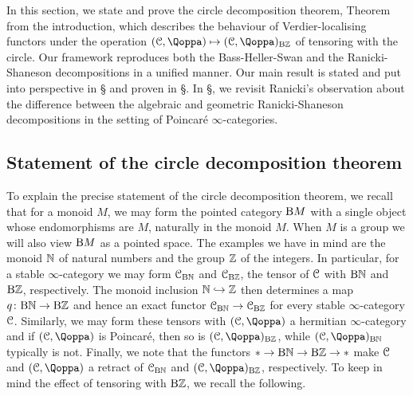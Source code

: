 In this section, we state and prove the circle decomposition theorem, Theorem~ from the introduction, which describes the behaviour of Verdier-localising functors under the operation $(\C,\QF) \mapsto (\C,\QF)_{\B\ZZ}$ of tensoring with the circle. Our framework reproduces both the Bass-Heller-Swan and the Ranicki-Shaneson decompositions in a unified manner. 
Our main result is stated and put into perspective in \S{} and proven in \S{}. In \S{}, we revisit Ranicki's observation about the difference between the algebraic and geometric Ranicki-Shaneson decompositions in the setting of Poincaré $\infty$-categories.



\subsection{Statement of the circle decomposition theorem}
\label{subsection:shaneson}%


 


To explain the precise statement of the circle decomposition theorem, we recall that for a monoid $M$, we may form the pointed category $\mathrm{B} M$ with a single object whose endomorphisms are $M$, naturally in the monoid $M$. When $M$ is a group we will also view $\mathrm{B} M$ as a pointed space. The examples we have in mind are the monoid $\mathbb{N}$ of natural numbers and the group $\mathbb{Z}$ of the integers.
In particular, 
for a stable $\infty$-category we may form $\mathcal C_{\mathrm{B}\mathbb{N}}$ and $\mathcal C_{\mathrm{B}\mathbb{Z}}$, the tensor of $\mathcal C$ with $\mathrm{B}\mathbb{N}$ and $\mathrm{B}\mathbb{Z}$, respectively. The monoid inclusion $\mathbb{N} \hookrightarrow \mathbb{Z}$ then determines a map $q\colon\mathrm{B}\mathbb{N} \to \mathrm{B}\mathbb{Z}$ and hence an exact functor $\mathcal C_{\mathrm{B}\mathbb{N}} \to \mathcal C_{\mathrm{B}\mathbb{Z}}$ for every stable $\infty$-category $\mathcal C$. 
Similarly, we may form these tensors with $(\C,\QF)$ a hermitian $\infty$-category and if $(\C,\QF)$ is Poincar\'e, then so is $(\C,\QF)_{\B\ZZ}$, while $(\C,\QF)_{\B\NN}$ typically is not. Finally, we note that the functors $\ast \to \mathrm{B}\mathbb{N} \to \mathrm{B}\mathbb{Z} \to \ast$ make $\mathcal C$ and $(\C,\QF)$ a retract of $\mathcal C_{\mathrm{B}\mathbb{N}}$ and $(\C,\QF)_{\B\ZZ}$, respectively. To keep in mind the effect of tensoring with $\mathrm{B}\mathbb{Z}$, we recall the following.

